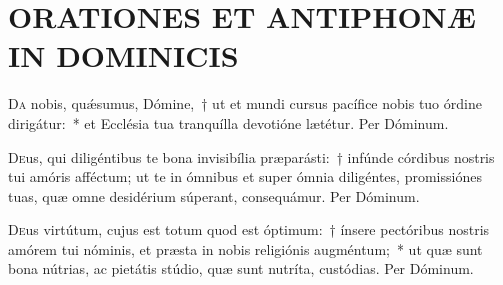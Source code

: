 \documentclass[vesperale_romanum.tex]{subfiles}
\begin{document}

\section*{ORATIONES ET ANTIPHONÆ IN DOMINICIS}

\subtitle{per ordinem dispositæ a quarta post Pentecosten usque ad Adventum.}





\oratio

\lettrine{D}{a} nobis, quǽsumus, Dómine,~† ut et mundi cursus pacífice nobis tuo órdine dirigátur:~* et Ecclésia tua tranquílla devotióne lætétur. Per Dóminum.



\oratio

\lettrine{D}{e}us, qui diligéntibus te bona invisibília præparásti:~† infúnde córdibus nostris tui amóris afféctum; ut te in ómnibus et super ómnia diligéntes, promissiónes tuas, quæ omne desidérium súperant, consequámur. Per Dóminum.



\oratio

\lettrine{D}{e}us virtútum, cujus est totum quod est óptimum:~† ínsere pectóribus nostris amórem tui nóminis, et præsta in nobis religiónis augméntum;~* ut quæ sunt bona nútrias, ac pietátis stúdio, quæ sunt nutríta, custódias.
Per Dóminum.



\oratio
\end{document}
